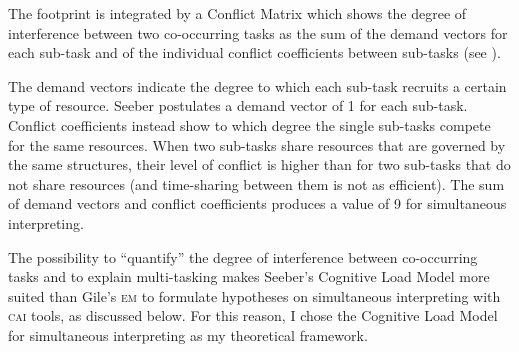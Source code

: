 \documentclass[output=paper]{langsci/langscibook}
\begin{document}
The footprint is integrated by a Conflict Matrix which shows the degree of interference between two co-occurring tasks as the sum of the demand vectors for each sub-task and of the individual conflict coefficients between sub-tasks (see ). 

The demand vectors indicate the degree to which each sub-task recruits a certain type of resource. Seeber postulates a demand vector of 1 for each sub-task. Conflict coefficients instead show to which degree the single sub-tasks compete for the same resources. When two sub-tasks share resources that are governed by the same structures, their level of conflict is higher than for two sub-tasks that do not share resources (and time-sharing between them is not as efficient). The sum of demand vectors and conflict coefficients produces a value of 9 for simultaneous interpreting.

The possibility to ``quantify'' the degree of interference between co-occurring tasks and to explain multi-tasking makes Seeber’s Cognitive Load Model more suited than Gile’s \textsc{em} to formulate hypotheses on simultaneous interpreting with \textsc{cai} tools, as discussed below. For this reason, I chose the Cognitive Load Model for simultaneous interpreting as my theoretical framework.
\end{document}
